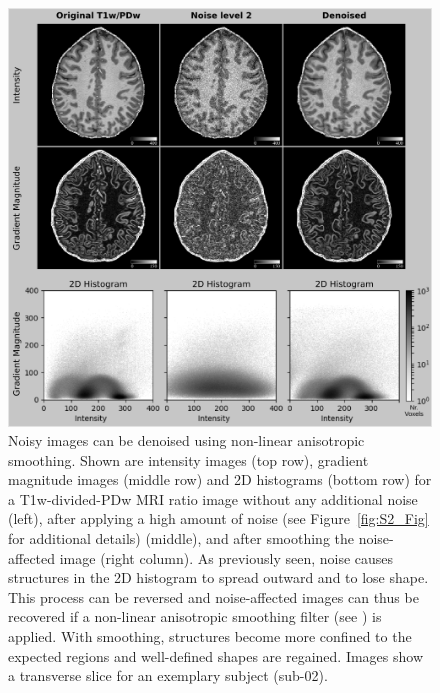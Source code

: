 \begin{figure}[htbp!]
\centering
\includegraphics[width=\textwidth]{figures/chapter_02_SI/supp_gramag_denoising_slices_and_histograms.png}
\caption{Noisy images can be denoised using non-linear anisotropic smoothing. Shown are intensity images (top row), gradient magnitude images (middle row) and 2D histograms (bottom row) for a T1w-divided-PDw MRI ratio image without any additional noise (left), after applying a high amount of noise (see Figure~\ref{fig:S2_Fig} for additional details) (middle), and after smoothing the noise-affected image (right column). As previously seen, noise causes structures in the 2D histogram to spread outward and to lose shape. This process can be reversed and noise-affected images can thus be recovered if a non-linear anisotropic smoothing filter (see \parencite{Weickert1998}) is applied. With smoothing, structures become more confined to the expected regions and well-defined shapes are regained. Images show a transverse slice for an exemplary subject (sub-02).}
\label{fig:S3_Fig}
\end{figure}

